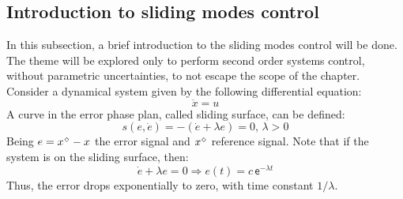 \subsection{Introduction to sliding modes control}\label{S02-3}

In this subsection, a brief introduction to the sliding modes control will be done. The theme will be explored only to perform second order systems control, without parametric uncertainties, to not escape the scope of the chapter. \\

Consider a dynamical system given by the following differential equation:
\begin{equation} \label{eq:SimpleODE}
\ddot{x} = u
\end{equation}
A curve in the error phase plan, called sliding surface, can be defined:
\begin{equation} \label{eq:SlidingSurface}
s(e, \dot{e}) = - (\dot{e} + \lambda e) = 0, \, \lambda > 0
\end{equation}
Being $e = x^{\scriptscriptstyle \diamondsuit} - x$ the error signal and $x^{\scriptscriptstyle \diamondsuit}$ reference signal. 
Note that if the system is on the sliding surface, then:
\begin{equation} \label{eq:SlidingError}
\dot{e} + \lambda e = 0 \Rightarrow e(t) = c \, \mathsf{e}^{- \lambda t}
\end{equation}
Thus, the error drops exponentially to zero, with time constant $1/\lambda$.

